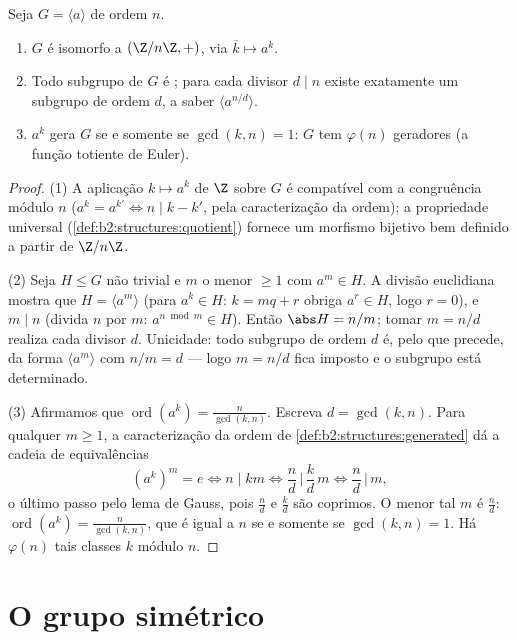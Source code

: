 \begin{proposition}\label{prop:b2:structures:cyclic}
Seja $G = \langle a \rangle$  de ordem $n$.
\begin{enumerate}
  \item $G$ é isomorfo a $(\Z/n\Z, +)$, via $\overline k \mapsto
        a^k$.
  \item Todo subgrupo de $G$ é ; para cada divisor $d \mid n$
        existe exatamente um subgrupo de ordem $d$, a saber $\langle
        a^{n/d}\rangle$.
  \item $a^k$ gera $G$ se e somente se $\gcd(k, n) = 1$: $G$ tem
        $\varphi(n)$ geradores (a função totiente de Euler).
\end{enumerate}
\end{proposition}

\begin{proof}
(1) A aplicação $k \mapsto a^k$ de $\Z$ sobre $G$ é compatível com a
congruência módulo $n$ ($a^{k} = a^{k'} \iff n \mid k - k'$, pela caracterização da ordem);
a propriedade universal
(\cref{def:b2:structures:quotient}) fornece um morfismo bijetivo
bem definido a partir de $\Z/n\Z$.

(2) Seja $H \leq G$ não trivial e $m$ o menor $\geq 1$ com $a^m \in
H$. A divisão euclidiana mostra que $H = \langle a^m\rangle$ (para $a^k \in
H$: $k = mq + r$ obriga $a^r \in H$, logo $r = 0$), e $m \mid n$
(divida $n$ por $m$: $a^{n \bmod m} \in H$). Então $\abs H = n/m$;
tomar $m = n/d$ realiza cada divisor $d$. Unicidade: todo subgrupo
de ordem $d$ é, pelo que precede, da forma $\langle a^m \rangle$
com $n/m = d$ --- logo $m = n/d$ fica imposto e o subgrupo está
determinado.

(3) Afirmamos que $\operatorname{ord}(a^k) = \frac{n}{\gcd(k, n)}$.
Escreva $d = \gcd(k, n)$. Para qualquer $m \geq 1$, a caracterização da ordem
de \cref{def:b2:structures:generated} dá a
cadeia de equivalências
\[
(a^k)^m = e
\iff n \mid km
\iff \frac{n}{d} \,\Big|\, \frac{k}{d}\,m
\iff \frac{n}{d} \,\Big|\, m ,
\]
o último passo pelo lema de Gauss, pois $\frac nd$ e $\frac kd$
são coprimos. O menor tal $m$ é $\frac nd$:
$\operatorname{ord}(a^k) = \frac n{\gcd(k,n)}$, que é igual a $n$
se e somente se $\gcd(k, n) = 1$. Há $\varphi(n)$ tais classes $k$
módulo $n$.
\end{proof}

\section{O grupo simétrico}


